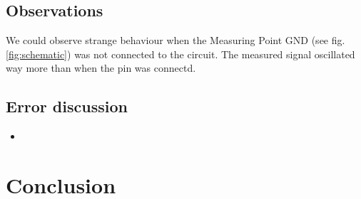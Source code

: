 \documentclass{article}
\begin{document}
\subsection{Observations}
We could observe strange behaviour when the Measuring Point GND (see fig. \ref{fig:schematic}) was not connected to the circuit. The measured signal oscillated way more than when the pin was connectd.


\subsection{Error discussion}

\begin{itemize}
    \item 
\end{itemize}


\section{Conclusion}



\end{document}
